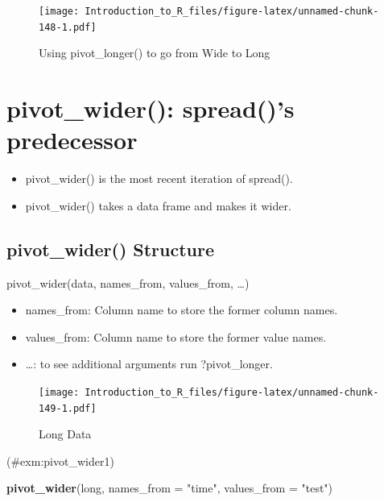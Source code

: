\documentclass[]{book}
\newenvironment{Shaded}{\begin{snugshade}}{\end{snugshade}}
\newcommand{\DataTypeTok}[1]{\textcolor[rgb]{0.13,0.29,0.53}{#1}}
\newcommand{\KeywordTok}[1]{\textcolor[rgb]{0.13,0.29,0.53}{\textbf{#1}}}
\newcommand{\NormalTok}[1]{#1}
\newcommand{\StringTok}[1]{\textcolor[rgb]{0.31,0.60,0.02}{#1}}
\providecommand{\tightlist}{%
  \setlength{\itemsep}{0pt}\setlength{\parskip}{0pt}}
\theoremstyle{definition}
\theoremstyle{definition}
\theoremstyle{definition}
\theoremstyle{remark}
\let\BeginKnitrBlock\begin \let\EndKnitrBlock\end
\begin{document}
\begin{figure}
\centering
\texttt{[image: Introduction\_to\_R\_files/figure-latex/unnamed-chunk-148-1.pdf]}
\caption{\label{fig:unnamed-chunk-148}Using pivot\_longer() to go from Wide to Long}
\end{figure}

\hypertarget{pivot_wider-spreads-predecessor}{%
\section{pivot\_wider(): spread()'s predecessor}\label{pivot_wider-spreads-predecessor}}

\begin{itemize}
\tightlist
\item
  pivot\_wider() is the most recent iteration of spread().
\item
  pivot\_wider() takes a data frame and makes it wider.
\end{itemize}

\hypertarget{pivot_wider-structure}{%
\subsection{pivot\_wider() Structure}\label{pivot_wider-structure}}

pivot\_wider(data, names\_from, values\_from, \ldots{})

\begin{itemize}
\tightlist
\item
  names\_from: Column name to store the former column names.
\item
  values\_from: Column name to store the former value names.
\item
  \ldots{}: to see additional arguments run ?pivot\_longer.
\end{itemize}

\begin{figure}
\centering
\texttt{[image: Introduction\_to\_R\_files/figure-latex/unnamed-chunk-149-1.pdf]}
\caption{\label{fig:unnamed-chunk-149}Long Data}
\end{figure}

\BeginKnitrBlock{example}
\protect\hypertarget{exm:pivot_wider1}{}{(\#exm:pivot\_wider1) }
\EndKnitrBlock{example}

\begin{Shaded}
\begin{Highlighting}[]
\KeywordTok{pivot_wider}\NormalTok{(long, }\DataTypeTok{names_from =}  \StringTok{"time"}\NormalTok{, }\DataTypeTok{values_from =} \StringTok{"test"}\NormalTok{)}
\end{Highlighting}
\end{Shaded}
\end{document}
